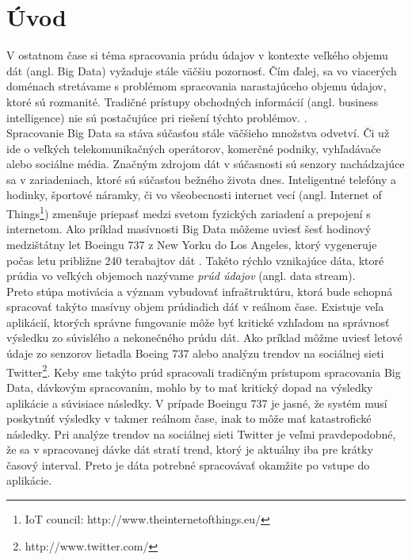 
\chapter{Úvod}
V ostatnom čase si téma spracovania prúdu údajov v kontexte veľkého objemu dát (angl. Big Data) vyžaduje stále väčšiu pozornosť. Čím ďalej, sa vo viacerých doménach stretávame s problémom spracovania narastajúceho objemu údajov, ktoré sú rozmanité. Tradičné prístupy obchodných informácií (angl. business intelligence) nie sú postačujúce pri riešení týchto problémov. \citep{liu2014survey}. 
\\
Spracovanie Big Data sa stáva súčasťou stále väčšieho množstva odvetví. Či už ide o veľkých telekomunikačných operátorov, komerčné podniky, vyhľadávače alebo sociálne média. 
Značným zdrojom dát v súčasnosti sú senzory nachádzajúce sa v zariadeniach, ktoré sú súčasťou bežného života dnes. 
Inteligentné telefóny a hodinky, športové náramky, či vo všeobecnosti internet vecí (angl. Internet of Things\footnote{IoT council: http://www.theinternetofthings.eu/}) zmenšuje priepasť medzi svetom fyzických zariadení a prepojení s internetom. 
Ako príklad masívnosti Big Data môžeme uviesť šesť hodinový medzištátny let Boeingu 737 z New Yorku do Los Angeles, ktorý vygeneruje počas letu približne 240 terabajtov dát \citep{boeing}. Takéto rýchlo vznikajúce dáta, ktoré prúdia vo veľkých objemoch nazývame \textit{prúd údajov} (angl. data stream). 
\\
Preto stúpa motivácia a význam vybudovať infraštruktúru, ktorá bude schopná spracovať takýto masívny objem prúdiadich dáť v reálnom čase. Existuje veľa aplikácií, ktorých správne fungovanie môže byť kritické vzhľadom na správnosť výsledku zo súvislého a nekonečného prúdu dát. Ako príklad môžme uviesť letové údaje zo senzorov lietadla Boeing 737 alebo analýzu trendov na sociálnej sieti Twitter\footnote{http://www.twitter.com/}. Keby sme takýto prúd spracovali tradičným prístupom spracovania Big Data, dávkovým spracovaním, mohlo by to mať kritický dopad na výsledky aplikácie a súvisiace následky. V prípade Boeingu 737 je jasné, že systém musí poskytnúť výsledky v takmer reálnom čase, inak to môže mať katastrofické následky. Pri analýze trendov na sociálnej sieti Twitter je veľmi pravdepodobné\citep{mathioudakis2010twittermonitor}, že sa v spracovanej dávke dát stratí trend, ktorý je aktuálny iba pre krátky časový interval. Preto je dáta potrebné spracovávať okamžite po vstupe do aplikácie. 
\\
